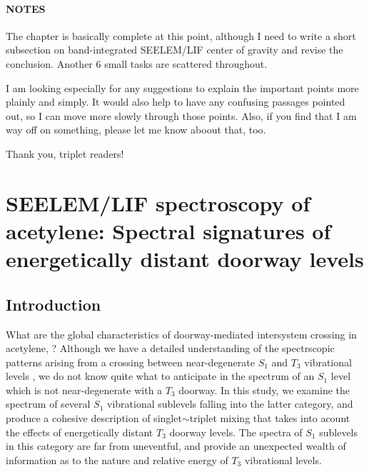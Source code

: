 \documentclass[12pt]{mitthesis}
\begin{document}
\tableofcontents
\clearpage

\listoffigures
\clearpage

\subsubsection*{NOTES}
The chapter is basically complete at this point, although I need to
write a short subsection on band-integrated SEELEM/LIF center of
gravity and revise the conclusion.  Another 6 small tasks are
scattered throughout.

I am looking especially for any suggestions to explain the important
points more plainly and simply.  It would also help to have any
confusing passages pointed out, so I can move more slowly through
those points.  Also, if you find that I am way off on something,
please let me know aboout that, too.

Thank you, triplet readers!

\clearpage

\setcounter{chapter}{3}
\chapter{SEELEM/LIF spectroscopy of acetylene: Spectral signatures of
  energetically distant doorway levels}

\section{Introduction}

What are the global characteristics of doorway-mediated intersystem
crossing in acetylene, ?  Although we have a detailed
understanding of the spectrscopic patterns arising from a crossing
between near-degenerate $S_1$ and $T_3$ vibrational levels
\cite{humphrey97, altunata00, altunata01, mishra04}, we do not know
quite what to anticipate in the spectrum of an $S_1$ level which is
not near-degenerate with a $T_3$ doorway.  In this study, we examine
the spectrum of several $S_1$ vibrational sublevels falling into the
latter category, and produce a cohesive description of
singlet$\sim$triplet mixing that takes into acount the effects of
energetically distant $T_3$ doorway levels.  The spectra of $S_1$
sublevels in this category are far from uneventful, and provide an
unexpected wealth of information as to the nature and relative energy
of $T_3$ vibrational levels.
\end{document}
